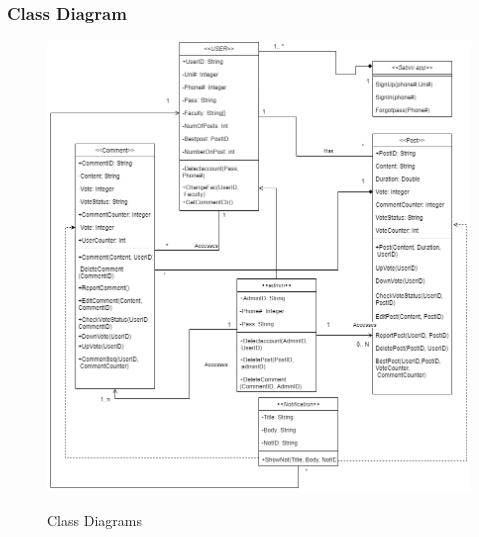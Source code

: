 \documentclass[12pt]{article}
\begin{document}
\sectionbreak

\subsubsection{Class Diagram}
\vspace{-9.4em}
\begin{figure}[h!]
{\includegraphics[width=1.1\textwidth]{./ClassDiagram/ClassDiagram.PNG}}
  \caption{Class Diagrams}
\end{figure}
\sectionbreak
\clearpage
\end{document}
